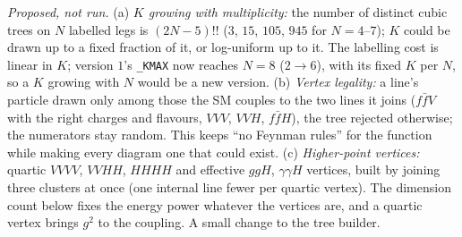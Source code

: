 \documentclass[11pt]{article}
\newcommand{\code}[1]{\texttt{#1}}
\begin{document}
\par\smallskip\noindent \emph{Proposed, not run.}
(a) \emph{$K$ growing with multiplicity:} the number of distinct cubic trees on $N$ labelled legs is $(2N-5)!!$
($3$, $15$, $105$, $945$ for $N=4$--$7$); $K$ could be drawn up to a fixed fraction of it, or log-uniform up to it. The
labelling cost is linear in $K$; version $1$'s \code{\_KMAX} now reaches $N=8$ ($2\to6$), with its fixed $K$ per $N$,
so a $K$ growing with $N$ would be a new version.
(b) \emph{Vertex legality:} a line's particle drawn only among those the SM couples to the two lines it joins
($f\bar fV$ with the right charges and flavours, $VVV$, $VVH$, $f\bar fH$), the tree rejected otherwise; the numerators
stay random. This keeps ``no Feynman rules'' for the function while making every diagram one that could exist.
(c) \emph{Higher-point vertices:} quartic $VVVV$, $VVHH$, $HHHH$ and effective $ggH$, $\gamma\gamma H$ vertices, built by
joining three clusters at once (one internal line fewer per quartic vertex). The dimension count below fixes the energy
power whatever the vertices are, and a quartic vertex brings $g^2$ to the coupling. A small change to the tree builder.
\end{document}
